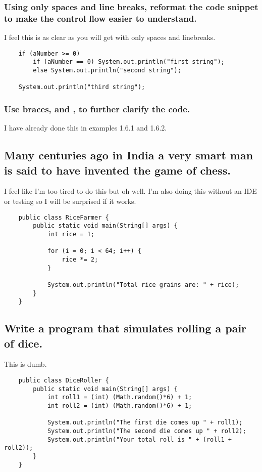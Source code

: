 \documentclass{article}
\begin{document}
    \newpage
    \subsubsection{Using only spaces and line breaks, reformat the code snippet to make the control flow easier to understand.}
    
    I feel this is as clear as you will get with only spaces and linebreaks.
    
    \begin{verbatim}
    if (aNumber >= 0)
        if (aNumber == 0) System.out.println("first string");
        else System.out.println("second string");
    
    System.out.println("third string");
    \end{verbatim}

    \subsubsection{Use braces, { and }, to further clarify the code.}
    I have already done this in examples 1.6.1 and 1.6.2.

    \subsection{Many centuries ago in India a very smart man is said to have invented the game of chess.}
    I feel like I'm too tired to do this but oh well. I'm also doing this without an IDE or testing so I will be surprised if it works.

    \begin{verbatim}
    public class RiceFarmer {
        public static void main(String[] args) {
            int rice = 1;
            
            for (i = 0; i < 64; i++) {
                rice *= 2;
            }
            
            System.out.println("Total rice grains are: " + rice);
        }
    }
    \end{verbatim}

    \subsection{Write a program that simulates rolling a pair of dice.}
    This is dumb.
    \begin{verbatim}
    public class DiceRoller {
        public static void main(String[] args) {
            int roll1 = (int) (Math.random()*6) + 1;
            int roll2 = (int) (Math.random()*6) + 1;
            
            System.out.println("The first die comes up " + roll1);
            System.out.println("The second die comes up " + roll2);
            System.out.println("Your total roll is " + (roll1 + roll2));
        }
    }
    \end{verbatim}
\end{document}
